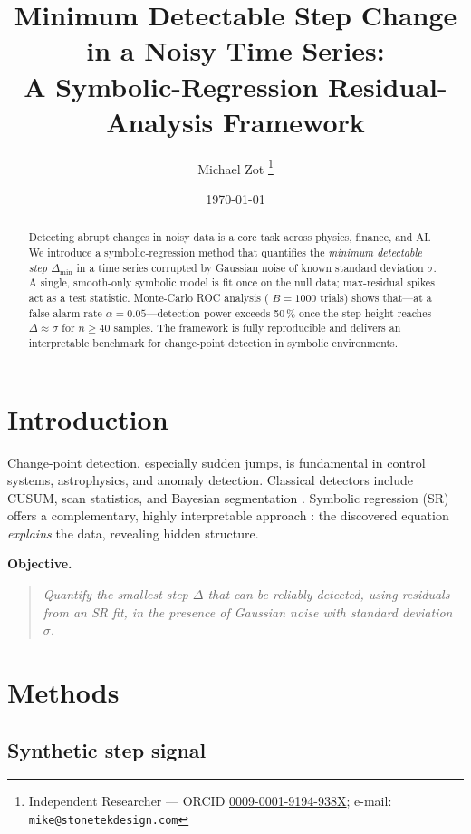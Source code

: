 \documentclass[11pt,a4paper]{article}
\title{\textbf{Minimum Detectable Step Change in a Noisy Time Series:\\
A Symbolic-Regression Residual-Analysis Framework}}
\author{Michael Zot%
  \thanks{Independent Researcher — ORCID
          \href{https://orcid.org/0009-0001-9194-938X}{0009-0001-9194-938X};
          e-mail: \texttt{mike@stonetekdesign.com}}}
\date{\today}
\begin{document}
\maketitle

\begin{abstract}
Detecting abrupt changes in noisy data is a core task across physics,
finance, and AI.  We introduce a symbolic-regression method that
quantifies the \emph{minimum detectable step}
\(\Delta_{\min}\) in a time series corrupted by Gaussian noise of known
standard deviation \(\sigma\).  A single, smooth-only symbolic model is
fit once on the null data; max-residual spikes act as a test statistic.
Monte-Carlo ROC analysis ( \(B=1000\) trials) shows that—at a
false-alarm rate \(\alpha=0.05\)—detection power exceeds 50\,\% once the
step height reaches \(\Delta\approx\sigma\) for \(n\ge40\) samples.  The
framework is fully reproducible and delivers an interpretable benchmark
for change-point detection in symbolic environments.
\end{abstract}

\section{Introduction}

Change-point detection, especially sudden jumps, is fundamental in control
systems, astrophysics, and anomaly detection.  Classical detectors
include CUSUM, scan statistics, and Bayesian segmentation
\citep{brockwell2002introduction,kay1998fundamentals}.  Symbolic
regression (SR) offers a complementary, highly interpretable approach
\citep{schmidt2009distilling}: the discovered equation \emph{explains}
the data, revealing hidden structure.

\smallskip\noindent
\textbf{Objective.}
\begin{quote}
  \emph{Quantify the smallest step \(\Delta\) that can be reliably
  detected, using residuals from an SR fit, in the presence of Gaussian
  noise with standard deviation \(\sigma\).}
\end{quote}

\section{Methods}
\subsection{Synthetic step signal}
\end{document}
